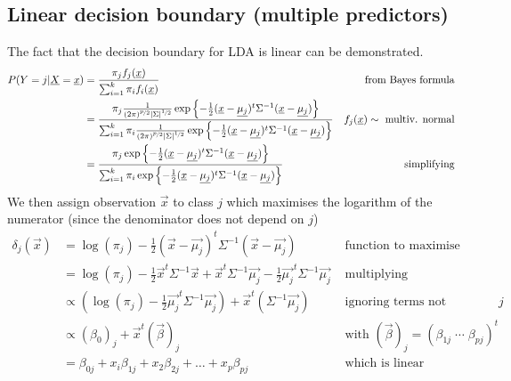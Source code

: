     \subsection{Linear decision boundary (multiple predictors)}
      The fact that the decision boundary for LDA is linear can be demonstrated.
      \begin{align*}
      P(Y=j|\vec{X} = \vec{x})
      & = \frac{\pi_jf_j(\vec{x})}{\sum_{i=1}^{k}\pi_if_i(\vec{x})} 
      & \text{ from Bayes formula} \\
      & = \frac
      {\pi_j\frac{1}{(2\pi)^{\nicefrac{p}{2}}|\Sigma|^{\nicefrac{1}{2}}}\exp\left\{-\frac{1}{2}(\vec{x}-\vec{\mu_j})^t \Sigma^{-1} (\vec{x}-\vec{\mu_j})\right\}}
      {\sum_{i=1}^{k}\pi_i\frac{1}{(2\pi)^{\nicefrac{p}{2}}|\Sigma|^{\nicefrac{1}{2}}}\exp\left\{-\frac{1}{2}(\vec{x}-\vec{\mu_j})^t \Sigma^{-1} (\vec{x}-\vec{\mu_j})\right\}}
      & f_j(\vec{x})\sim\text{ multiv. normal}\\
      & = \frac
      {\pi_j\exp\left\{-\frac{1}{2}(\vec{x}-\vec{\mu_j})^t \Sigma^{-1} (\vec{x}-\vec{\mu_j})\right\}}
      {\sum_{i=1}^{k}\pi_i\exp\left\{-\frac{1}{2}(\vec{x}-\vec{\mu_j})^t \Sigma^{-1} (\vec{x}-\vec{\mu_j})\right\}}
      & \text{ simplifying}
      \end{align*}
      We then assign observation $\vec{x}$ to class $j$ which maximises the
      logarithm of the numerator (since the denominator does not depend on $j$)
      \begin{align*}
      \delta_j(\vec{x})
      & = \log(\pi_j) -\frac{1}{2}(\vec{x}-\vec{\mu_j})^t \Sigma^{-1} (\vec{x}-\vec{\mu_j})
      & \text{ function to maximise} \\
      & = \log(\pi_j) -\frac{1}{2}\vec{x}^t\Sigma^{-1}\vec{x} + \vec{x}^t \Sigma^{-1}\vec{\mu_j} - \frac{1}{2}\vec{\mu_j}^t\Sigma^{-1}\vec{\mu_j}
      & \text{ multiplying} \\
      & \propto \left(\log(\pi_j) - \frac{1}{2}\vec{\mu_j}^t\Sigma^{-1}\vec{\mu_j}\right) + \vec{x}^t \left(\Sigma^{-1}\vec{\mu_j}\right)
      & \text{ ignoring terms not depending on } j\\
      & \propto (\beta_0)_j + \vec{x}^t (\vec{\beta})_j
      & \text{ with } (\vec{\beta})_j = (\beta_{1j} \;\cdots\; \beta_{pj})^t \\
      & = \beta_{0j} + x_i\beta_{1j} + x_2\beta_{2j} + \dots + x_p\beta_{pj}
      & \text{ which is linear}
      \end{align*}
      
